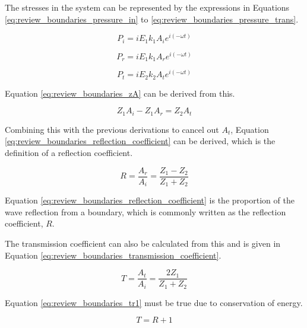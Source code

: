 The stresses in the system can be represented by the expressions in Equations \ref{eq:review_boundaries_pressure_in} to \ref{eq:review_boundaries_pressure_trans}.

\begin{equation} \label{eq:review_boundaries_pressure_in}
P_{i} = iE_{1}k_{1}A_{i}e^{i(-\omega t)}
\end{equation}

\begin{equation} \label{eq:review_boundaries_pressure_ref}
P_{r} = iE_{1}k_{1}A_{r}e^{i(-\omega t)}
\end{equation}

\begin{equation} \label{eq:review_boundaries_pressure_trans}
P_{t} = iE_{2}k_{2}A_{t}e^{i(-\omega t)}
\end{equation}

Equation \ref{eq:review_boundaries_zA} can be derived from this.

\begin{equation} \label{eq:review_boundaries_zA}
Z_{1}A_{i} - Z_{1}A_{r} = Z_{2}A_{t} 
\end{equation}

Combining this with the previous derivations to cancel out $A_{t}$, Equation \ref{eq:review_boundaries_reflection_coefficient} can be derived, which is the definition of a reflection coefficient.

\begin{equation} \label{eq:review_boundaries_reflection_coefficient}
R = \frac{A_{r}}{A_{i}} = \frac{Z_{1} - Z_{2}}{Z_{1} + Z_{2}}
\end{equation}

Equation \ref{eq:review_boundaries_reflection_coefficient} is the proportion of the wave reflection from a boundary, which is commonly written as the reflection coefficient, $R$.

The transmission coefficient can also be calculated from this and is given in Equation \ref{eq:review_boundaries_transmission_coefficient}.

\begin{equation} \label{eq:review_boundaries_transmission_coefficient}
T = \frac{A_{t}}{A_{i}} = \frac{2Z_{1}}{Z_{1} + Z_{2}}
\end{equation}

Equation \ref{eq:review_boundaries_tr1} must be true due to conservation of energy.

\begin{equation} \label{eq:review_boundaries_tr1}
T = R + 1
\end{equation}

